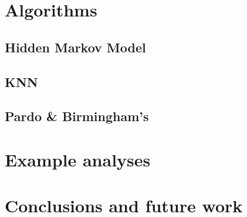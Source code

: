 \section{Algorithms}
\label{sec:algorithms}

\subsection{Hidden Markov Model}
\label{sec:hidden-markov-model}

\subsection{KNN}
\label{sec:knn}

\subsection{Pardo \& Birmingham's}
\label{sec:pardo--birminghams}

\section{Example analyses}
\label{sec:example-analyses}

\section{Conclusions and future work}
\label{sec:concl-future-work}


